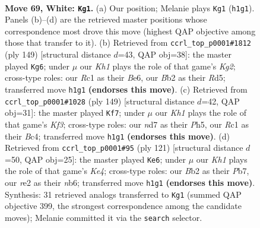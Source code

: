 \documentclass[11pt]{article}
\begin{document}
\clearpage

\begin{figure}[p]\centering
\begin{subfigure}{0.46\textwidth}\centering
\resizebox{\linewidth}{!}{%
\newchessgame
\chessboard[
  setfen={6k1/3n4/6P1/8/p1p5/P1P4p/1BP1r2P/2R4K w - - 27 69},
  showmover=false,
  pgfstyle=straightmove, color=movearrow, markmove={h1-g1}
]}
\caption{}
\end{subfigure}\hfill
\begin{subfigure}{0.46\textwidth}\centering
\resizebox{\linewidth}{!}{%
\newchessgame
\chessboard[
  setfen={8/2R2pk1/4b3/3r1p1p/5P1P/6P1/4B3/4K3 b - - 0 75},
  showmover=false,
  pgfstyle=straightmove, color=movearrow, markmove={g7-g6}
]}
\caption{}
\end{subfigure}
\\[4pt]
\begin{subfigure}{0.46\textwidth}\centering
\resizebox{\linewidth}{!}{%
\newchessgame
\chessboard[
  setfen={8/8/1R2pk2/3pp2p/2b1P3/1p3PP1/3K4/8 b - - 1 75},
  showmover=false,
  pgfstyle=straightmove, color=movearrow, markmove={f6-f7}
]}
\caption{}
\end{subfigure}\hfill
\begin{subfigure}{0.46\textwidth}\centering
\resizebox{\linewidth}{!}{%
\newchessgame
\chessboard[
  setfen={3r4/1p6/pN6/P1Pbk2p/7P/5p2/5K2/3R4 b - - 13 61},
  showmover=false,
  pgfstyle=straightmove, color=movearrow, markmove={e5-e6}
]}
\caption{}
\end{subfigure}
\caption{\textbf{Move 69, White: \texttt{Kg1}.} (a) Our position; Melanie plays \texttt{Kg1} (\texttt{h1g1}). Panels (b)--(d) are the retrieved master positions whose correspondence most drove this move (highest QAP objective among those that transfer to it). (b) Retrieved from \texttt{ccrl\_top\_p0001\#1812} (ply 149) [structural distance $d$=43, QAP obj=38]: the master played \texttt{Kg6}; under $\mu$ our \emph{Kh1} plays the role of that game's \emph{Kg2}; cross-type roles: our \emph{R}c1 as their \emph{B}e6, our \emph{B}b2 as their \emph{R}d5; transferred move \texttt{h1g1} \textbf{(endorses this move)}. (c) Retrieved from \texttt{ccrl\_top\_p0001\#1028} (ply 149) [structural distance $d$=42, QAP obj=31]: the master played \texttt{Kf7}; under $\mu$ our \emph{Kh1} plays the role of that game's \emph{Kf3}; cross-type roles: our \emph{n}d7 as their \emph{P}h5, our \emph{R}c1 as their \emph{B}c4; transferred move \texttt{h1g1} \textbf{(endorses this move)}. (d) Retrieved from \texttt{ccrl\_top\_p0001\#95} (ply 121) [structural distance $d$=50, QAP obj=25]: the master played \texttt{Ke6}; under $\mu$ our \emph{Kh1} plays the role of that game's \emph{Ke4}; cross-type roles: our \emph{B}b2 as their \emph{P}b7, our \emph{r}e2 as their \emph{n}b6; transferred move \texttt{h1g1} \textbf{(endorses this move)}. Synthesis: 31 retrieved analogs transferred to \texttt{Kg1} (summed QAP objective 399, the strongest correspondence among the candidate moves); Melanie committed it via the \texttt{search} selector.}
\label{fig:thought-m136}
\end{figure}
\end{document}
